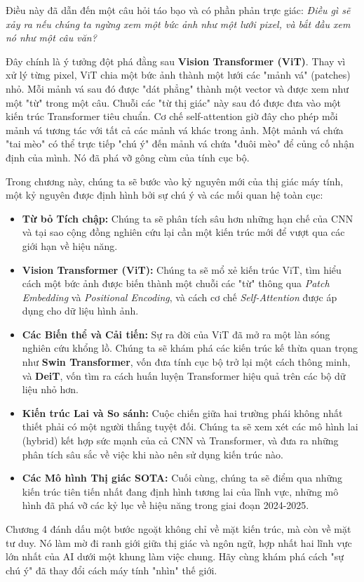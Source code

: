 Điều này đã dẫn đến một câu hỏi táo bạo và có phần phản trực giác: \textit{Điều gì sẽ xảy ra nếu chúng ta ngừng xem một bức ảnh như một lưới pixel, và bắt đầu xem nó như một câu văn?}

Đây chính là ý tưởng đột phá đằng sau \textbf{Vision Transformer (ViT)}. Thay vì xử lý từng pixel, ViT chia một bức ảnh thành một lưới các "mảnh vá" (patches) nhỏ. Mỗi mảnh vá sau đó được "dát phẳng" thành một vector và được xem như một "từ" trong một câu. Chuỗi các "từ thị giác" này sau đó được đưa vào một kiến trúc Transformer tiêu chuẩn. Cơ chế self-attention giờ đây cho phép mỗi mảnh vá tương tác với tất cả các mảnh vá khác trong ảnh. Một mảnh vá chứa "tai mèo" có thể trực tiếp "chú ý" đến mảnh vá chứa "đuôi mèo" để củng cố nhận định của mình. Nó đã phá vỡ gông cùm của tính cục bộ.

Trong chương này, chúng ta sẽ bước vào kỷ nguyên mới của thị giác máy tính, một kỷ nguyên được định hình bởi sự chú ý và các mối quan hệ toàn cục:
\begin{itemize}
	\item \textbf{Từ bỏ Tích chập:} Chúng ta sẽ phân tích sâu hơn những hạn chế của CNN và tại sao cộng đồng nghiên cứu lại cần một kiến trúc mới để vượt qua các giới hạn về hiệu năng.
	
	\item \textbf{Vision Transformer (ViT):} Chúng ta sẽ mổ xẻ kiến trúc ViT, tìm hiểu cách một bức ảnh được biến thành một chuỗi các "từ" thông qua \textit{Patch Embedding} và \textit{Positional Encoding}, và cách cơ chế \textit{Self-Attention} được áp dụng cho dữ liệu hình ảnh.
	
	\item \textbf{Các Biến thể và Cải tiến:} Sự ra đời của ViT đã mở ra một làn sóng nghiên cứu khổng lồ. Chúng ta sẽ khám phá các kiến trúc kế thừa quan trọng như \textbf{Swin Transformer}, vốn đưa tính cục bộ trở lại một cách thông minh, và \textbf{DeiT}, vốn tìm ra cách huấn luyện Transformer hiệu quả trên các bộ dữ liệu nhỏ hơn.
	
	\item \textbf{Kiến trúc Lai và So sánh:} Cuộc chiến giữa hai trường phái không nhất thiết phải có một người thắng tuyệt đối. Chúng ta sẽ xem xét các mô hình lai (hybrid) kết hợp sức mạnh của cả CNN và Transformer, và đưa ra những phân tích sâu sắc về việc khi nào nên sử dụng kiến trúc nào.
	
	\item \textbf{Các Mô hình Thị giác SOTA:} Cuối cùng, chúng ta sẽ điểm qua những kiến trúc tiên tiến nhất đang định hình tương lai của lĩnh vực, những mô hình đã phá vỡ các kỷ lục về hiệu năng trong giai đoạn 2024-2025.
\end{itemize}

Chương 4 đánh dấu một bước ngoặt không chỉ về mặt kiến trúc, mà còn về mặt tư duy. Nó làm mờ đi ranh giới giữa thị giác và ngôn ngữ, hợp nhất hai lĩnh vực lớn nhất của AI dưới một khung làm việc chung. Hãy cùng khám phá cách "sự chú ý" đã thay đổi cách máy tính "nhìn" thế giới.